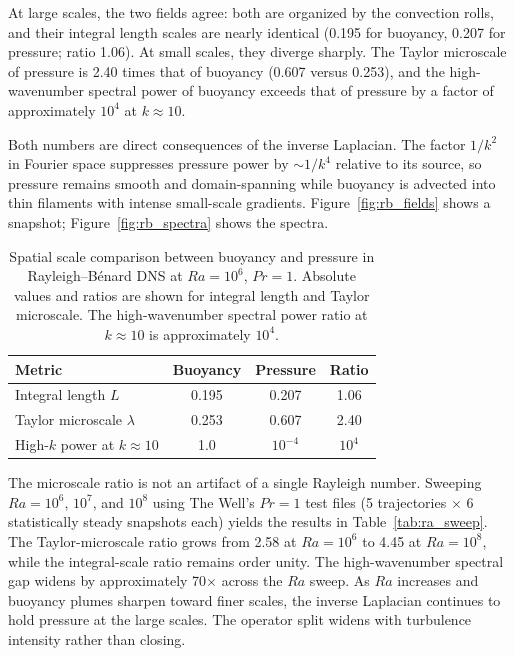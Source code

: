 \documentclass[aps,prfluids,preprint,superscriptaddress,nofootinbib]{revtex4-2}
\begin{document}
At large scales, the two fields agree: both are organized by the convection rolls, and their integral length scales are nearly identical (0.195 for buoyancy, 0.207 for pressure; ratio 1.06). At small scales, they diverge sharply. The Taylor microscale of pressure is 2.40 times that of buoyancy (0.607 versus 0.253), and the high-wavenumber spectral power of buoyancy exceeds that of pressure by a factor of approximately $10^4$ at $k \approx 10$.

Both numbers are direct consequences of the inverse Laplacian. The factor $1/k^2$ in Fourier space suppresses pressure power by $\sim 1/k^4$ relative to its source, so pressure remains smooth and domain-spanning while buoyancy is advected into thin filaments with intense small-scale gradients. Figure~\ref{fig:rb_fields} shows a snapshot; Figure~\ref{fig:rb_spectra} shows the spectra.

\begin{table}[t]
\centering
\caption{Spatial scale comparison between buoyancy and pressure in Rayleigh--B\'enard DNS at $Ra = 10^6$, $Pr = 1$. Absolute values and ratios are shown for integral length and Taylor microscale. The high-wavenumber spectral power ratio at $k \approx 10$ is approximately $10^4$.}
\label{tab:dns_scales}
\begin{tabular}{lccc}
\toprule
Metric & Buoyancy & Pressure & Ratio \\
\midrule
Integral length $L$ & 0.195 & 0.207 & 1.06 \\
Taylor microscale $\lambda$ & 0.253 & 0.607 & 2.40 \\
High-$k$ power at $k \approx 10$ & 1.0 & $10^{-4}$ & $10^4$ \\
\bottomrule
\end{tabular}
\end{table}

The microscale ratio is not an artifact of a single Rayleigh number. Sweeping $Ra = 10^6$, $10^7$, and $10^8$ using The Well's $Pr = 1$ test files (5 trajectories $\times$ 6 statistically steady snapshots each) yields the results in Table~\ref{tab:ra_sweep}. The Taylor-microscale ratio grows from 2.58 at $Ra = 10^6$ to 4.45 at $Ra = 10^8$, while the integral-scale ratio remains order unity. The high-wavenumber spectral gap widens by approximately 70$\times$ across the $Ra$ sweep. As $Ra$ increases and buoyancy plumes sharpen toward finer scales, the inverse Laplacian continues to hold pressure at the large scales. The operator split widens with turbulence intensity rather than closing.
\end{document}
